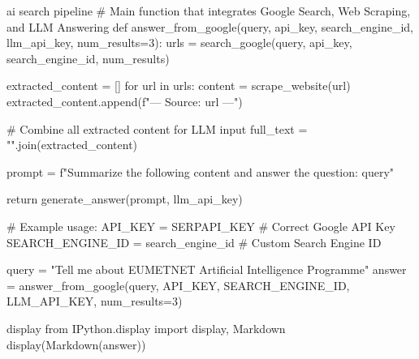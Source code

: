 \begin{codeonly}{ai search pipeline}
# Main function that integrates Google Search, Web Scraping, and LLM Answering
def answer_from_google(query, api_key, search_engine_id, llm_api_key, num_results=3):
    urls = search_google(query, api_key, search_engine_id, num_results)

    extracted_content = []
    for url in urls:
        content = scrape_website(url)
        extracted_content.append(f"\n--- Source: {url} ---")

    # Combine all extracted content for LLM input
    full_text = "\n\n".join(extracted_content)

    prompt = f"Summarize the following content and answer the question: {query}\n{}"

    return generate_answer(prompt, llm_api_key)

# Example usage:
API_KEY = SERPAPI_KEY  # Correct Google API Key
SEARCH_ENGINE_ID = search_engine_id  # Custom Search Engine ID

query = "Tell me about EUMETNET Artificial Intelligence Programme"
answer = answer_from_google(query, API_KEY, SEARCH_ENGINE_ID, LLM_API_KEY, num_results=3)
\end{codeonly}


\begin{codeonly}{display}
 from IPython.display import display, Markdown
display(Markdown(answer))
\end{codeonly}

